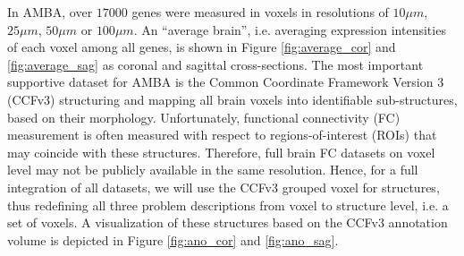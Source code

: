 \documentclass[]{article}
\renewcommand{\cite}{\citep}
\begin{document}
In AMBA, over $17000$ genes were measured in voxels in resolutions of $10\mu m$, $25\mu m$, $50\mu m$ or $100\mu m$. An ``average brain'', i.e. averaging expression intensities of each voxel among all genes, is shown in Figure \ref{fig:average_cor} and \ref{fig:average_sag} as coronal and sagittal cross-sections.
The most important supportive dataset for AMBA is the Common Coordinate Framework Version 3 (CCFv3)\cite{wang2020allen} structuring  and mapping all brain voxels into identifiable sub-structures, based on their morphology. Unfortunately, functional connectivity (FC) measurement is often measured with respect to regions-of-interest (ROIs) that may coincide with these structures. Therefore, full brain FC datasets on voxel level may not be publicly available in the same resolution. Hence, for a full integration of all datasets, we will use the CCFv3 grouped voxel for structures, thus redefining all three problem descriptions from voxel to structure level, i.e. a set of voxels. A visualization of these structures based on the CCFv3 annotation volume is depicted in Figure \ref{fig:ano_cor} and \ref{fig:ano_sag}.\\
\end{document}
